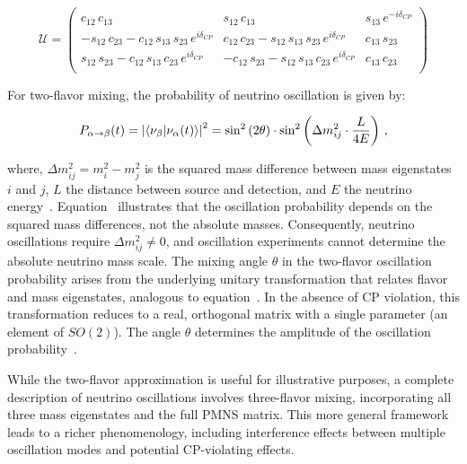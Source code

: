 \begin{equation}
\label{eq:PMNS_matrix}
	\mathcal{U} = \begin{pmatrix} 
	c_{12} \, c_{13} & s_{12}\, c_{13} & s_{13} \, e^{-i \delta_{CP}} \\ 
	-s_{12} \, c_{23} - c_{12} \, s_{13} \, s_{23} \, e^{i \delta_{CP}} & c_{12} \, c_{23} - s_{12} \, s_{13} \, s_{23} \, e^{i \delta_{CP}} & c_{13} \, s_{23} \\
	s_{12} \, s_{23} - c_{12} \, s_{13} \, c_{23} \, e^{i \delta_{CP}} & -c_{12} \, s_{23} - s_{12} \, s_{13} \, c_{23} \, e^{i \delta_{CP}} & c_{13} \, c_{23} \\ \end{pmatrix} 
\end{equation}

\noindent For two-flavor mixing, the probability of neutrino oscillation is given by:

\begin{equation} 
\label{eq:neutrino_oscillation_prob}
    P_{\alpha \to \beta}(t) = \abs{\bra{\nu_{\beta}} \ket{\nu_{\alpha}(t)}}^2 = \sin^2 \left( 2 \theta \right) \cdot  \sin^2 \left( \Delta m^2_{ij} \cdot \frac{L}{4E} \right) \,,
\end{equation}

\noindent where, $\Delta m^2_{ij} = m^2_i - m^2_j$ is the squared mass difference between mass eigenstates $i$ and $j$, $L$ the distance between source and detection, and $E$ the neutrino energy~\cite{zuber_neutrino_2020}. 
Equation~ illustrates that the oscillation probability depends on the squared mass differences, not the absolute masses. Consequently, neutrino oscillations require $\Delta m^2_{ij} \neq 0$, and oscillation experiments cannot determine the absolute neutrino mass scale. 
The mixing angle $\theta$ in the two-flavor oscillation probability arises from the underlying unitary transformation that relates flavor and mass eigenstates, analogous to equation~. In the absence of CP violation, this transformation reduces to a real, orthogonal matrix with a single parameter (an element of $SO(2)$). The angle $\theta$ determines the amplitude of the oscillation probability~\cite{zuber_neutrino_2020}. 

While the two-flavor approximation is useful for illustrative purposes, a complete description of neutrino oscillations involves three-flavor mixing, incorporating all three mass eigenstates and the full PMNS matrix. This more general framework leads to a richer phenomenology, including interference effects between multiple oscillation modes and potential CP-violating effects. 


